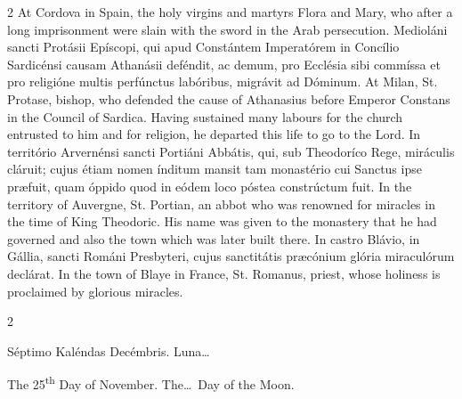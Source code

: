 \begin{paracol}{2}
At Cordova in Spain, the holy 
 virgins and martyrs Flora and Mary, who after a long imprisonment were slain 
 with the sword in the Arab persecution.
\switchcolumn*
{}
Medioláni sancti 
 Protásii Epíscopi, qui apud Constántem Imperatórem in Concílio Sardicénsi 
 causam Athanásii deféndit, ac demum, pro Ecclésia sibi commíssa et pro 
 religióne multis perfúnctus labóribus, migrávit ad Dóminum.
\switchcolumn
{}
At Milan, St. Protase, bishop, who 
 defended the cause of Athanasius before Emperor Constans in the Council of 
 Sardica. Having sustained many labours for the church entrusted to him 
 and for religion, he departed this life to go to the Lord.
\switchcolumn*
{}
In território 
 Arvernénsi sancti Portiáni Abbátis, qui, sub Theodoríco Rege, miráculis 
 cláruit; cujus étiam nomen índitum mansit tam monastério cui Sanctus ipse 
 præfuit, quam óppido quod in eódem loco póstea constrúctum fuit.
\switchcolumn
{}
In the territory of Auvergne, St. 
 Portian, an abbot who was renowned for miracles in the time of King 
 Theodoric. His name was given to the monastery that he had governed 
 and also the town which was later built there.
\switchcolumn*
{}
In castro Blávio, in 
 Gállia, sancti Románi Presbyteri, cujus sanctitátis præcónium glória 
 miraculórum declárat.
\switchcolumn
{}
In the town of Blaye in France, St. 
 Romanus, priest, whose holiness is proclaimed by glorious miracles.
\switchcolumn*
{}
\end{paracol}


\begin{paracol}{2}
\begin{center}{\color{gregoriocolor} Séptimo Kaléndas Decémbris. 
 Luna\dots\ }\end{center}
\switchcolumn
{}
\begin{center}{\color{gregoriocolor} The 
 25\textsuperscript{th} Day of 
 November. The\dots\ Day of the Moon.}\end{center}
\end{paracol}

